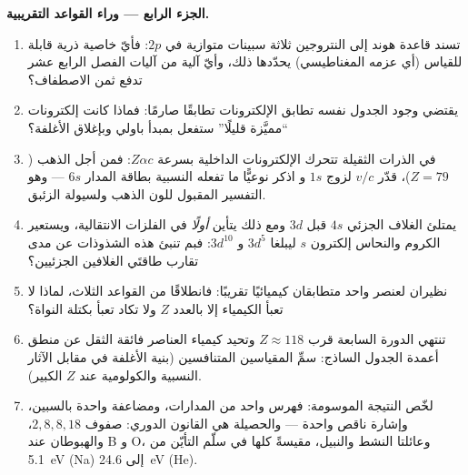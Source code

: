 \begin{problem}
\medskip\noindent\textbf{الجزء الرابع --- وراء القواعد التقريبية.}
\begin{enumerate}[resume]
  \item تسند قاعدة هوند إلى النتروجين ثلاثة سبينات متوازية في $2p$:
        فأيّ خاصية ذرية قابلة للقياس (أي عزمه المغناطيسي)
        يحدّدها ذلك، وأيّ آلية من آليات الفصل الرابع عشر تدفع ثمن
        الاصطفاف؟
  \item يقتضي وجود الجدول نفسه تطابق الإلكترونات تطابقًا
        صارمًا: فماذا كانت إلكترونات ``مميَّزة قليلًا''
        ستفعل بمبدأ باولي وبإغلاق الأغلفة؟
  \item في الذرات الثقيلة تتحرك الإلكترونات الداخلية بسرعة $Z\alpha c$:
        فمن أجل الذهب ($Z = 79$)، قدّر $v/c$ لزوج $1s$ و
        اذكر نوعيًّا ما تفعله النسبية بطاقة المدار
        $6s$ --- وهو التفسير المقبول للون الذهب
        ولسيولة الزئبق.
  \item يمتلئ الغلاف الجزئي $4s$ قبل $3d$ ومع ذلك يتأين
        \emph{أولًا} في الفلزات الانتقالية، ويستعير الكروم والنحاس
        إلكترون $s$ ليبلغا $3d^5$ و $3d^{10}$: فبم
        تنبئ هذه الشذوذات عن مدى تقارب طاقتَي الغلافين
        الجزئيين؟
  \item نظيران لعنصر واحد متطابقان كيميائيًا تقريبًا:
        فانطلاقًا من القواعد الثلاث، لماذا لا تعبأ الكيمياء إلا
        بالعدد $Z$ ولا تكاد تعبأ بكتلة النواة؟
  \item تنتهي الدورة السابعة قرب $Z \approx 118$ وتحيد كيمياء
        العناصر فائقة الثقل عن منطق أعمدة الجدول الساذج:
        سمِّ المقياسين المتنافسين (بنية الأغلفة في مقابل
        الآثار النسبية والكولومية عند $Z$ الكبير).
  \item لخّص النتيجة الموسومة: فهرس واحد من المدارات، ومضاعفة
        واحدة بالسبين، وإشارة ناقص واحدة --- والحصيلة هي
        القانون الدوري: صفوف $2, 8, 8, 18$، والهبوطان عند B و O،
        وعائلتا النشط والنبيل، مقيسةً كلها في
        سلّم التأيّن من \qty{5.1}{eV} (Na) إلى
        \qty{24.6}{eV} (He).
\end{enumerate}
\end{problem}
